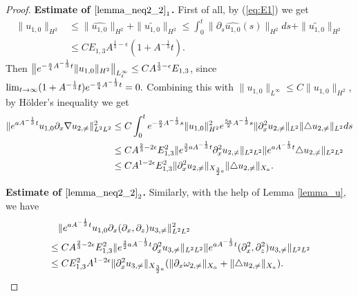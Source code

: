 \documentclass[12pt, reqno]{amsart}
\newcommand{\ben}{\begin{eqnarray}}
\newcommand{\een}{\end{eqnarray}}
\numberwithin{equation}{section}
\begin{document}
	\begin{proof}
		{\bf Estimate of $\eqref{lemma_neq2_2}_1$.}
		First of all, by (\ref{eq:E1}) we get
		\ben\label{eq:u10}
				\|{u_{1,0}}\|_{H^2}
				&\leq \|\widehat{u_{1,0}}\|_{H^2}+\|\widetilde{u_{1,0}}\|_{H^2}\leq \int_0^t \|\partial_s\widehat{u_{1,0}}(s)\|_{H^2}ds
				+\|\widetilde{u_{1,0}}\|_{H^2}\nonumber\\
				&\leq CE_{1,3}A^{\frac13-\epsilon}(1+A^{-\frac13}t).
			\een
		Then
		$\big\|{\rm e}^{-\frac{a}{4}A^{-\frac13}t}\|{u_{1,0}}\|_{H^2}\big\|_{L^{\infty}_t} \leq CA^{\frac13-\epsilon}E_{1,3}$, since $\lim_{t\rightarrow\infty}(1+A^{-\frac13}t){\rm e}^{-\frac{a}{4}A^{-\frac13}t}=0.$
		Combining this with $\|u_{1,0}\|_{L^{\infty}}\leq C\|u_{1,0}\|_{H^2}$, by 
		H\"{o}lder's inequality we get
		\begin{equation*}
			\begin{aligned}
				\|{\rm e}^{aA^{-\frac{1}{3}}t}
				u_{1,0}\partial_x\nabla	u_{2,\neq}\|_{L^2L^2}^2
				&\leq C\int_0^t{\rm 	e}^{-\frac{a}{2}A^{-\frac13}s}\|{u_{1,0}}\|^2_{H^2}
				{\rm e}^{\frac{5a}{2}A^{-\frac13}s}
				\|\partial_x^2 u_{2,\neq}\|_{L^2}
				\|\triangle u_{2,\neq}\|_{L^2}ds\\
				&\leq CA^{\frac23-2\epsilon}E_{1,3}^2
				\|{\rm e}^{\frac{3}{2}aA^{-\frac{1}{3}}t}\partial_x^2
				u_{2,\neq}\|_{L^2L^2}
				\|{\rm e}^{aA^{-\frac{1}{3}}t}\triangle 	
				u_{2,\neq}\|_{L^2L^2}\\
				&\leq CA^{1-2\epsilon}E_{1,3}^2
				\|\partial_x^2u_{2,\neq}\|_{X_{\frac32a}}
				\|\triangle u_{2,\neq}\|_{X_{a}}.
			\end{aligned}
		\end{equation*}
		
		{\bf Estimate of $\eqref{lemma_neq2_2}_2$.}
		Similarly, with the help of Lemma \ref{lemma_u}, we have
		\begin{equation*}
			\begin{aligned}
				&\quad\|{\rm e}^{aA^{-\frac{1}{3}}t}
				u_{1,0}\partial_x(\partial_x,\partial_z)u_{3,\neq}\|_{L^2L^2}^2\\
				&\leq CA^{\frac23-2\epsilon}E_{1,3}^2
				\|{\rm e}^{\frac{3}{2}aA^{-\frac{1}{3}}t}\partial_x^2
				u_{3,\neq}\|_{L^2L^2}
				\|{\rm e}^{aA^{-\frac{1}{3}}t}(\partial_x^2,\partial_z^2)
				u_{3,\neq}\|_{L^2L^2}\\
				&\leq CE^2_{1,3}A^{1-2\epsilon}
				\|\partial_x^2u_{3,\neq}\|_{X_{\frac32a}}
				(\|\partial_x \omega_{2,\neq}\|_{X_{a}}+\|\triangle u_{2,\neq}\|_{X_{a}}).
			\end{aligned}
		\end{equation*}
		

\end{proof}
\end{document}
